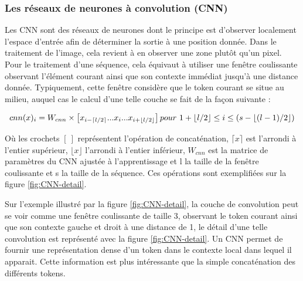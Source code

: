 \documentclass[12pt,a4paper,times,twoside,openright]{report}
\begin{document}
        
            \subsubsection{Les réseaux de neurones à convolution (CNN)}
            \label{subsubsec:CNNs}
Les CNN sont des réseaux de neurones dont le principe est d'observer localement l'espace d'entrée afin de déterminer la sortie à une position donnée. Dans le traitement de l'image, cela revient à en observer une zone plutôt qu'un pixel. Pour le traitement d'une séquence, cela équivaut à utiliser une fenêtre coulissante observant l'élément courant ainsi que son contexte immédiat jusqu'à une distance donnée. Typiquement, cette fenêtre considère que le token courant se situe au milieu, auquel cas le calcul d'une telle couche se fait de la façon suivante :

\begin{equation}\label{eq:CNN-formula}
cnn(x)_{i} = W_{cnn} \times \left[ x_{i-\lceil l/2 \rceil} ... x_{i} ... x_{i+ \lfloor l/2 \rfloor} \right]\\ pour\ 1+\lfloor l/2 \rfloor \leq i \leq (s - \lfloor (l-1)/2 \rfloor)
\end{equation}

Où les crochets $[\ ]$ représentent l'opération de concaténation, $\lceil x \rceil$ est l'arrondi à l'entier supérieur, $\lfloor x \rfloor$ l'arrondi à l'entier inférieur, $W_{cnn}$ est la matrice de paramètres du CNN ajustée à l'apprentissage et l la taille de la fenêtre coulissante et s la taille de la séquence. Ces opérations sont exemplifiées sur la figure \ref{fig:CNN-detail}.

Sur l'exemple illustré par la figure \ref{fig:CNN-detail}, la couche de convolution peut se voir comme une fenêtre coulissante de taille 3, observant le token courant ainsi que son contexte gauche et droit à une distance de 1, le détail d'une telle convolution est représenté avec la figure \ref{fig:CNN-detail}. Un CNN permet de fournir une représentation dense d'un token dans le contexte local dans lequel il apparait. Cette information est plus intéressante que la simple concaténation des différents tokens.
\end{document}
